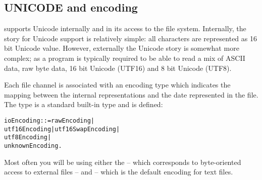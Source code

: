


\subsection{UNICODE and encoding}
\go supports Unicode internally and in its access to the file system. Internally, the story for Unicode support is relatively simple: all characters are represented as 16 bit Unicode value. However, externally the Unicode story is somewhat more complex; as a \go program is typically required to be able to read a mix of ASCII data, raw byte data, 16 bit Unicode (UTF16) and 8 bit Unicode (UTF8).

Each file channel is associated with an encoding type which indicates the mapping between the internal representations and the date represented in the file. The  type is a standard built-in type and is defined:
\begin{alltt}
ioEncoding ::= rawEncoding | 
   utf16Encoding | utf16SwapEncoding |
   utf8Encoding |
   unknownEncoding.
\end{alltt}
Most often you will be using either the  -- which corresponds to byte-oriented access to external files -- and  -- which is the default encoding for text files. 

